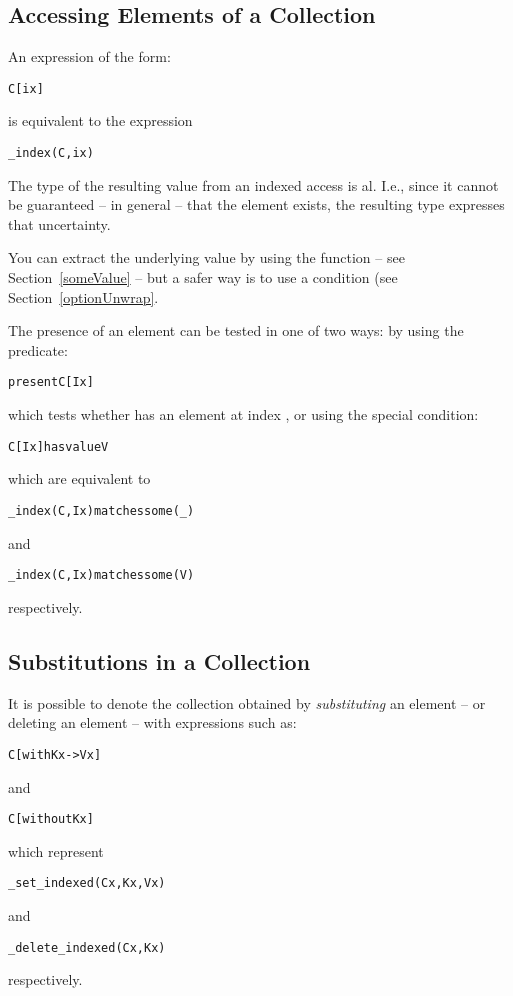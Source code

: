 \subsection{Accessing Elements of a Collection}
\label{indexedAccess}
An expression of the form:
\begin{alltt}
C[ix]
\end{alltt}
is equivalent to the expression
\begin{alltt}
\_index(C,ix)
\end{alltt}
\begin{aside}
The type of the resulting value from an indexed access is al. I.e., since it cannot be guaranteed -- in general -- that the element exists, the resulting type expresses that uncertainty.

You can extract the underlying value by using the  function -- see Section~\vref{someValue} -- but a safer way is to use a  condition (see Section~\vref{optionUnwrap}.
\end{aside}

The presence of an element can be tested in one of two ways: by using the  predicate:
\begin{alltt}
present C[Ix]
\end{alltt}
which tests whether  has an element at index , or using the special condition:
\begin{alltt}
C[Ix] has value V
\end{alltt}
which are equivalent to
\begin{alltt}
_index(C,Ix) matches some(_)
\end{alltt}
and
\begin{alltt}
_index(C,Ix) matches some(V)
\end{alltt}
respectively.
 
\subsection{Substitutions in a Collection}
It is possible to denote the collection obtained by \emph{substituting} an element -- or deleting an element -- with expressions such as:
\begin{alltt}
C[with Kx->Vx]
\end{alltt}
and
\begin{alltt}
C[without Kx]
\end{alltt}
which represent
\begin{alltt}
_set_indexed(Cx,Kx,Vx)
\end{alltt}
and
\begin{alltt}
_delete_indexed(Cx,Kx)
\end{alltt}
respectively.

